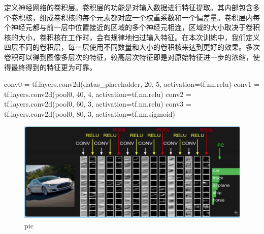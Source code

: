 \documentclass[12pt]{report}
\begin{document}
定义神经网络的卷积层。卷积层的功能是对输入数据进行特征提取。其内部包含多个卷积核，组成卷积核的每个元素都对应一个权重系数和一个偏差量。卷积层内每个神经元都与前一层中位置接近的区域的多个神经元相连，区域的大小取决于卷积核的大小，卷积核在工作时，会有规律地扫过输入特征。在本次训练中，我们定义四层不同的卷积层，每一层使用不同数量和大小的卷积核来达到更好的效果。多次卷积可以得到图像多层次的特征，较高层次特征即是对原始特征进一步的浓缩，使得最终得到的特征更为可靠。
\begin{python}
conv0 = tf.layers.conv2d(datas_placeholder, 20, 5, activation=tf.nn.relu)
conv1 = tf.layers.conv2d(pool0, 40, 4, activation=tf.nn.relu)
conv2 = tf.layers.conv2d(pool0, 60, 3, activation=tf.nn.relu)
conv3 = tf.layers.conv2d(pool0, 80, 3, activation=tf.nn.sigmoid)
\end{python}
\begin{figure}[h]
\centering
  \includegraphics[width=15cm]{4.png} %
  \caption{pic} %
  \label{DirectedEdgeDetect} %
\end{figure}
\end{document}
